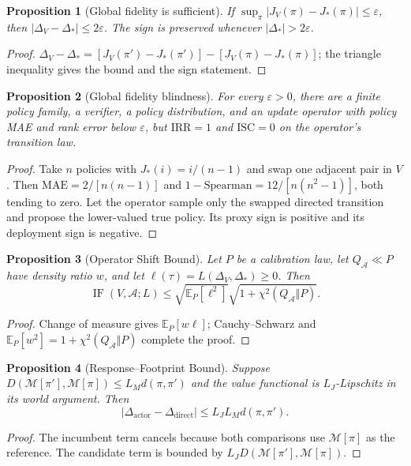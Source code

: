 \documentclass{article}
\newcommand{\E}{\mathbb{E}}
\newcommand{\M}{\mathcal{M}}
\newcommand{\dproxy}{\Delta_V}
\newcommand{\dtrue}{\Delta_*}
\newcommand{\pii}{\pi}
\newcommand{\pip}{\pi'}
\newtheorem{proposition}{Proposition}
\begin{document}
\begin{proposition}[Global fidelity is sufficient]
If $\sup_\pi|J_V(\pi)-J_*(\pi)|\leq\varepsilon$, then
$|\dproxy-\dtrue|\leq2\varepsilon$.  The sign is preserved whenever
$|\dtrue|>2\varepsilon$.
\end{proposition}
\begin{proof}
$\dproxy-\dtrue=[J_V(\pip)-J_*(\pip)]-[J_V(\pii)-J_*(\pii)]$;
the triangle inequality gives the bound and the sign statement.
\end{proof}

\begin{proposition}[Global fidelity blindness]
For every $\varepsilon>0$, there are a finite policy family, a verifier, a
policy distribution, and an update operator with policy MAE and rank error
below $\varepsilon$, but $\mathrm{IRR}=1$ and $\mathrm{ISC}=0$ on the operator's
transition law.
\end{proposition}
\begin{proof}
Take $n$ policies with $J_*(i)=i/(n-1)$ and swap one adjacent pair in $V$.
Then $\mathrm{MAE}=2/[n(n-1)]$ and
$1-\mathrm{Spearman}=12/[n(n^2-1)]$, both tending to zero.  Let the operator
sample only the swapped directed transition and propose the lower-valued true
policy.  Its proxy sign is positive and its deployment sign is negative.
\end{proof}

\begin{proposition}[Operator Shift Bound]
Let $P$ be a calibration law, let $Q_{\mathcal A}\ll P$ have density ratio
$w$, and let $\ell(\tau)=L(\Delta_V,\Delta_*)\geq0$.  Then
\begin{equation}
 \operatorname{IF}(V,\mathcal A;L)
 \leq\sqrt{\E_P[\ell^2]}
       \sqrt{1+\chi^2(Q_{\mathcal A}\Vert P)}.
\end{equation}
\end{proposition}
\begin{proof}
Change of measure gives $\E_P[w\ell]$; Cauchy--Schwarz and
$\E_P[w^2]=1+\chi^2(Q_{\mathcal A}\Vert P)$ complete the proof.
\end{proof}

\begin{proposition}[Response--Footprint Bound]
Suppose $D(\M[\pip],\M[\pii])\leq L_Md(\pii,\pip)$ and the value functional is
$L_J$-Lipschitz in its world argument.  Then
\begin{equation}
 |\Delta_{\mathrm{actor}}-\Delta_{\mathrm{direct}}|
 \leq L_JL_Md(\pii,\pip).
\end{equation}
\end{proposition}
\begin{proof}
The incumbent term cancels because both comparisons use $\M[\pii]$ as the
reference.  The candidate term is bounded by
$L_JD(\M[\pip],\M[\pii])$.
\end{proof}
\end{document}
